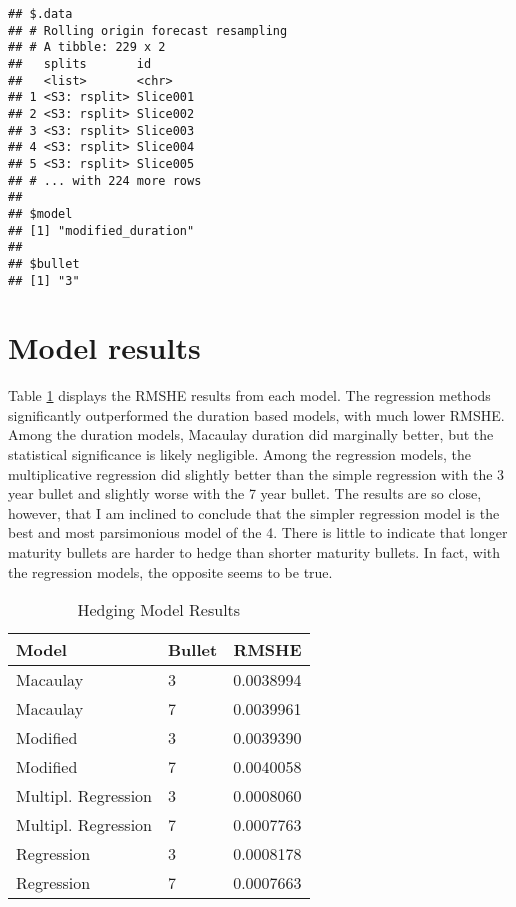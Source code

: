 \documentclass[openany]{book}
\theoremstyle{definition}
\theoremstyle{definition}
\theoremstyle{definition}
\theoremstyle{remark}
\begin{document}
\begin{verbatim}
## $.data
## # Rolling origin forecast resampling 
## # A tibble: 229 x 2
##   splits       id      
##   <list>       <chr>   
## 1 <S3: rsplit> Slice001
## 2 <S3: rsplit> Slice002
## 3 <S3: rsplit> Slice003
## 4 <S3: rsplit> Slice004
## 5 <S3: rsplit> Slice005
## # ... with 224 more rows
## 
## $model
## [1] "modified_duration"
## 
## $bullet
## [1] "3"
\end{verbatim}

\normalsize

\hypertarget{model-results}{%
\section{Model results}\label{model-results}}

Table \ref{tab:hedging-results} displays the RMSHE results from each
model. The regression methods significantly outperformed the duration
based models, with much lower RMSHE. Among the duration models, Macaulay
duration did marginally better, but the statistical significance is
likely negligible. Among the regression models, the multiplicative
regression did slightly better than the simple regression with the 3
year bullet and slightly worse with the 7 year bullet. The results are
so close, however, that I am inclined to conclude that the simpler
regression model is the best and most parsimonious model of the 4. There
is little to indicate that longer maturity bullets are harder to hedge
than shorter maturity bullets. In fact, with the regression models, the
opposite seems to be true.

\small

\begin{table}[H]

\caption{\label{tab:hedging-results}Hedging Model Results}
\centering
\begin{tabular}[t]{llr}
\toprule
Model & Bullet & RMSHE\\
\midrule
Macaulay & 3 & 0.0038994\\
Macaulay & 7 & 0.0039961\\
Modified & 3 & 0.0039390\\
Modified & 7 & 0.0040058\\
Multipl. Regression & 3 & 0.0008060\\
\addlinespace
Multipl. Regression & 7 & 0.0007763\\
Regression & 3 & 0.0008178\\
Regression & 7 & 0.0007663\\
\bottomrule
\end{tabular}
\end{table}
\end{document}
